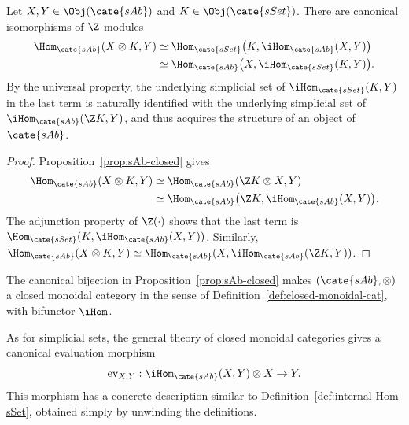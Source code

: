 \begin{corollary}
	Let $X,Y\in\Obj(\cate{sAb})$ and $K\in\Obj(\cate{sSet})$. There are
	canonical isomorphisms of $\Z$-modules
	\begin{align*}
		\Hom_{\cate{sAb}}(X\otimes K,Y)
		&\simeq\Hom_{\cate{sSet}}
		\bigl(K,\iHom_{\cate{sAb}}(X,Y)\bigr)\\
		&\simeq\Hom_{\cate{sAb}}
		\bigl(X,\iHom_{\cate{sSet}}(K,Y)\bigr).
	\end{align*}
	By the universal property, the underlying simplicial set of
	$\iHom_{\cate{sSet}}(K,Y)$ in the last term is naturally identified with
	the underlying simplicial set of $\iHom_{\cate{sAb}}(\Z K,Y)$, and thus
	acquires the structure of an object of $\cate{sAb}$.
\end{corollary}
\begin{proof}
	Proposition~\ref{prop:sAb-closed} gives
	\begin{align*}
		\Hom_{\cate{sAb}}(X\otimes K,Y)
		&\simeq\Hom_{\cate{sAb}}(\Z K\otimes X,Y)\\
		&\simeq\Hom_{\cate{sAb}}
		\bigl(\Z K,\iHom_{\cate{sAb}}(X,Y)\bigr).
	\end{align*}
	The adjunction property of $\Z(\cdot)$ shows that the last term is
	$\Hom_{\cate{sSet}}(K,\iHom_{\cate{sAb}}(X,Y))$. Similarly,
	$\Hom_{\cate{sAb}}(X\otimes K,Y)\simeq
	\Hom_{\cate{sAb}}(X,\iHom_{\cate{sAb}}(\Z K,Y))$.
\end{proof}

\begin{corollary}
	The canonical bijection in Proposition~\ref{prop:sAb-closed} makes
	$(\cate{sAb},\otimes)$ a closed monoidal category in the sense of
	Definition~\ref{def:closed-monoidal-cat}, with bifunctor $\iHom$.
\end{corollary}

As for simplicial sets, the general theory of closed monoidal categories
gives a canonical evaluation morphism
\[
\mathrm{ev}_{X,Y}:\iHom_{\cate{sAb}}(X,Y)\otimes X\to Y.
\]
This morphism has a concrete description similar to
Definition~\ref{def:internal-Hom-sSet}, obtained simply by unwinding the
definitions.


